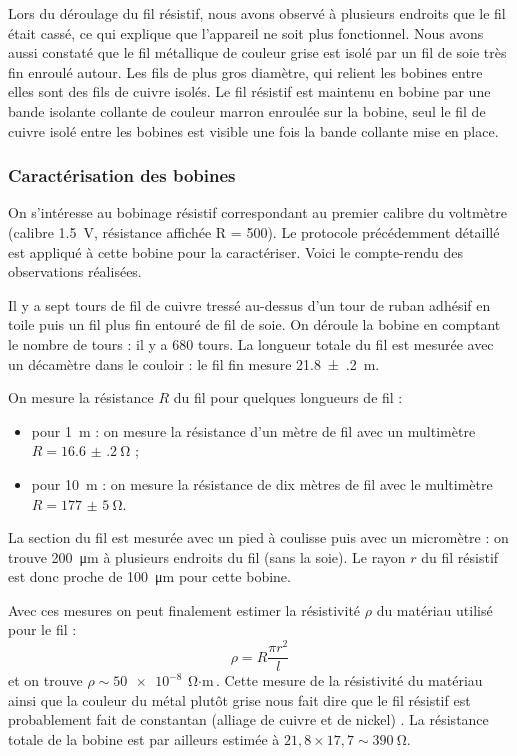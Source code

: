 \documentclass[12pt,a4paper,fleqn]{article}
\begin{document}
Lors du déroulage du fil résistif, nous avons observé à plusieurs endroits que le fil était cassé, ce qui explique que l'appareil ne soit plus fonctionnel.
Nous avons aussi constaté que le fil métallique de couleur grise est isolé par un fil de soie très fin enroulé autour.
Les fils de plus gros diamètre, qui relient les bobines entre elles sont des fils de cuivre isolés.
Le fil résistif est maintenu en bobine par une bande isolante collante de couleur marron enroulée sur la bobine, seul le fil de cuivre isolé entre les bobines est visible une fois la bande collante mise en place.

\subsubsection{Caractérisation des bobines}

On s'intéresse au bobinage résistif correspondant au premier calibre du voltmètre (calibre \SI{1.5}{V}, résistance affichée \og R = 500\fg{}).
Le protocole précédemment détaillé est appliqué à cette bobine pour la caractériser.
Voici le compte-rendu des observations réalisées.

Il y a sept tours de fil de cuivre tressé au-dessus d'un tour de ruban adhésif en toile puis un fil plus fin entouré de fil de soie.
On déroule la bobine en comptant le nombre de tours : il y a 680 tours.
La longueur totale du fil est mesurée avec un décamètre dans le couloir : le fil fin mesure \SI{21.8(2)}{m}.

On mesure la résistance $R$ du fil pour quelques longueurs de fil :
\begin{itemize}
\item pour \SI{1}{m} : on mesure la résistance d'un mètre de fil avec un multimètre $ R = \SI{16.6(2)}{\ohm}$ ;
\item pour \SI{10}{m} : on mesure la résistance de dix mètres de fil avec le multimètre $ R = \SI{177(5)}{\ohm} $.
\end{itemize}

La section du fil est mesurée avec un pied à coulisse puis avec un micromètre : on trouve \SI{200}{\micro\metre} à plusieurs endroits du fil (sans la soie).
Le rayon $r$ du fil résistif est donc proche de \SI{100}{\um} pour cette bobine.

Avec ces mesures on peut finalement estimer la résistivité $\rho$ du matériau utilisé pour le fil :
\[
\rho = R \frac{\pi r^2}{l}
\]
et on trouve $\rho \sim \SI{50e-8}{\ohm\cdot\meter}$.
Cette mesure de la résistivité du matériau ainsi que la couleur du métal plutôt grise nous fait dire que le fil résistif est probablement fait de constantan (alliage de cuivre et de nickel) \cite{res_fil}.
La résistance totale de la bobine est par ailleurs estimée à $21{,}8 \times 17{,}7 \sim \SI{390}{\ohm}$.
\end{document}

